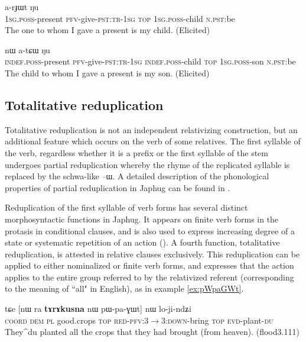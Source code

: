 \documentclass[oldfontcommands,oneside,a4paper,11pt]{article}
\newcommand{\ipa}[1]{{\phon #1}} %
\begin{document}
 		\begin{exe}
\ex \label{ex:apAro}
\gll
[\ipa{a-pɤro}  	\ipa{nɯ-mbi-t-a}]  	\ipa{nɯ}  	\ipa{a-rɟɯt}  	\ipa{ŋu}  \\
	\textsc{1sg.poss}-present \textsc{pfv}-give-\textsc{pst:tr-1sg} 	  \textsc{top} \textsc{1sg.poss}-child \textsc{n.pst}:be \\
\glt The one to whom I gave a present is my child. (Elicited)
 	  \end{exe} 

		\begin{exe}
\ex \label{ex:tApAro}
\gll
	[\ipa{tɤ-pɤro}  	\ipa{nɯ-mbi-t-a}]  	\ipa{tɤ-rɟɯt}  	\ipa{nɯ}  	\ipa{a-tɕɯ}  	\ipa{ŋu}   \\
	\textsc{indef.poss}-present \textsc{pfv}-give-\textsc{pst:tr-1sg} 	\textsc{indef.poss}-child \textsc{top} \textsc{1sg.poss}-son \textsc{n.pst}:be \\
\glt The child to whom I gave a present is my son. (Elicited)
 	  \end{exe} 

\subsection{Totalitative reduplication} \label{sec:redp}
Totalitative reduplication is not an independent relativizing construction, but an additional feature which occurs on the verb of some relatives. The first syllable of the verb, regardless whether it is a prefix or the first syllable of the stem undergoes partial reduplication whereby the rhyme of the replicated syllable is replaced by the schwa-like --\ipa{ɯ}. A detailed description of the phonological properties of partial reduplication in Japhug   can be found in \citet{jacques04these, jacques07redupl}.


Reduplication of the first syllable of   verb forms has several distinct morphosyntactic functions in Japhug. It appears on  finite verb forms in the protasis in conditional clauses, and is also used to express increasing degree of a state or systematic repetition of an action (\citealt{jacques07redupl}). A fourth function, totalitative reduplication, is attested in relative clauses exclusively. This reduplication can be applied to either nominalized or finite verb forms, and expresses that the action applies to the entire group referred to by the relativized referent (corresponding to the meaning of ``all" in English), as in example \ref{ex:pWpaGWt}.

  \begin{exe}
\ex \label{ex:pWpaGWt}
\gll
\ipa{tɕe}  	[\ipa{nɯ} \ipa{ra}  	\textbf{\ipa{tɤrɤkusna}}  	\ipa{nɯ}  	\ipa{pɯ-pa-ɣɯt}]  	\ipa{nɯ}  	\ipa{lo-ji-ndʑi}  \\
\textsc{coord} \textsc{dem} \textsc{pl} good.crops \textsc{top} \textsc{red-pfv:3$\rightarrow$3:down}-bring \textsc{top} \textsc{evd}-plant-\textsc{du} \\
\glt They^{du} planted all the crops that they had brought (from heaven). (flood3.111)
\end{exe}
 
\end{document}
